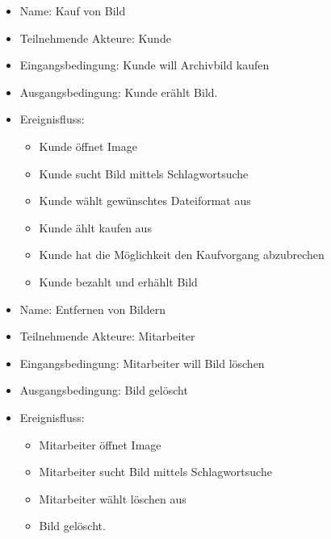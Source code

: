 \documentclass[parskip=full]{scrartcl}
\begin{document}
\begin{itemize}


\item Name: Kauf von Bild   

\item Teilnehmende Akteure: Kunde

\item Eingangsbedingung: Kunde will Archivbild kaufen

\item Ausgangsbedingung: Kunde er\"ahlt Bild.

\item Ereignisfluss: 
\begin{itemize}
\item Kunde \"offnet Image
\item Kunde sucht Bild mittels Schlagwortsuche
\item Kunde w\"ahlt gew\"unschtes Dateiformat aus
\item Kunde \"ahlt kaufen aus
\item Kunde hat die M\"oglichkeit den Kaufvorgang abzubrechen
\item Kunde bezahlt und erh\"ahlt Bild
\end{itemize}

\end{itemize}

\begin{itemize}


\item Name: Entfernen von Bildern

\item Teilnehmende Akteure: Mitarbeiter

\item Eingangsbedingung: Mitarbeiter will Bild l\"oschen

\item Ausgangsbedingung: Bild gel\"oscht

\item Ereignisfluss: 
\begin{itemize}
\item Mitarbeiter \"offnet Image
\item Mitarbeiter sucht Bild mittels Schlagwortsuche
\item Mitarbeiter w\"ahlt l\"oschen aus
\item Bild gel\"oscht.
\end{itemize}

\end{itemize}

\glsaddall
\printnoidxglossaries
\end{document}

